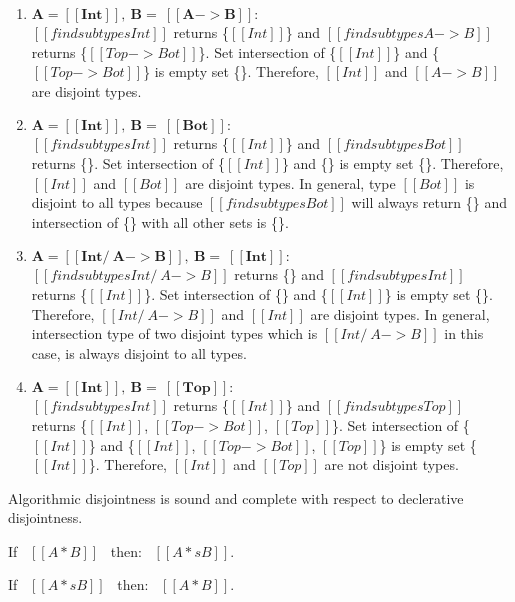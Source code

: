 \begin{enumerate}
  \item $\boldsymbol{A = [[Int]], \ B = \ [[A -> B]]:}$ \\
        $[[findsubtypes Int]]$ returns \{$[[Int]]$\} and $[[findsubtypes A -> B]]$ returns
        \{$[[Top -> Bot]]$\}. Set intersection of \{$[[Int]]$\} and \{$[[Top -> Bot]]$\} is
        empty set \{\}. Therefore, $[[Int]]$ and $[[A -> B]]$ are disjoint types.
  \item $\boldsymbol{A = [[Int]], \ B = \ [[Bot]]:}$ \\
        $[[findsubtypes Int]]$ returns \{$[[Int]]$\} and $[[findsubtypes Bot]]$ returns
        \{\}. Set intersection of \{$[[Int]]$\} and \{\} is
        empty set \{\}. Therefore, $[[Int]]$ and $[[Bot]]$ are disjoint types.
        In general, type $[[Bot]]$ is disjoint to all types because $[[findsubtypes Bot]]$
        will always return \{\} and intersection of \{\} with all other sets is \{\}.
  \item $\boldsymbol{A = [[Int /\ A -> B]], \ B = \ [[Int]]:}$ \\
        $[[findsubtypes Int /\ A -> B]]$ returns \{\} and $[[findsubtypes Int]]$ returns
        \{$[[Int]]$\}. Set intersection of \{\} and \{$[[Int]]$\} is
        empty set \{\}. Therefore, $[[Int /\ A -> B]]$ and $[[Int]]$ are disjoint types.
        In general, intersection type of two disjoint types which is $[[Int /\ A -> B]]$ in this case,
        is always disjoint to all types.
  \item $\boldsymbol{A = [[Int]], \ B = \ [[Top]]:}$ \\
        $[[findsubtypes Int]]$ returns \{$[[Int]]$\} and $[[findsubtypes Top]]$ returns
        \{$[[Int]]$, $[[Top -> Bot]]$, $[[Top]]$\}.
        Set intersection of \{$[[Int]]$\} and \{$[[Int]]$, $[[Top -> Bot]]$, $[[Top]]$\} is
        empty set \{$[[Int]]$\}. Therefore, $[[Int]]$ and $[[Top]]$ are not disjoint types.
\end{enumerate}

Algorithmic disjointness is sound and complete with respect to declerative disjointness.

\begin{lemma}
  If \ $[[A * B]]$ \ then: \ $[[A *s B]]$.
\label{lemma:inter:disj-sound}
\end{lemma}

\begin{lemma}
  If \ $[[A *s B]]$ \ then: \ $[[A * B]]$.
\label{lemma:inter:disj-complete}
\end{lemma}

